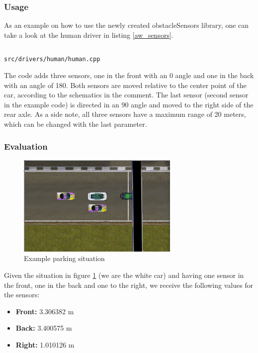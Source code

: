\documentclass[paper=a4, fontsize=11pt]{scrreprt}
\begin{document}
\subsubsection{Usage}
As an example on how to use the newly created obstacleSensors library,
one can take a look at the human driver in listing \ref{aw_sensors}.

\begin{listing}[ht]
  \inputminted[firstline=245,linenos=true,lastline=256,gobble=4]{c++}{../../../simulators/speed-dreams/src/drivers/human/human.cpp}
  \caption{\texttt{src/drivers/human/human.cpp}}\label{aw_sensors}
\end{listing}

The code adds three sensors, one in the front with an 0\degree{} angle
and one in the back with an angle of 180\degree{}.
Both sensors are moved relative to the center point of the car,
according to the schematics in the comment.
The last sensor (second sensor in the example code) is directed in an 90\degree{} angle
and moved to the right side of the rear axle.
As a side note, all three sensors have a maximum range of 20 meters,
which can be changed with the last parameter.

\subsubsection{Evaluation}
\begin{figure}[ht]
  \begin{center}
  \includegraphics[scale=0.5]{aw_imgs/parked.png}
\end{center}
\caption{Example parking situation}\label{aw_parked_img}
\end{figure}

Given the situation in figure \ref{aw_parked_img}
(we are the white car) and having one sensor in the front,
one in the back and one to the right,
we receive the following values for the sensors:
\begin{itemize}
  \item \textbf{Front:} 3.306382 m
  \item \textbf{Back:} 3.400575 m
  \item \textbf{Right:} 1.010126 m
\end{itemize}
\end{document}
